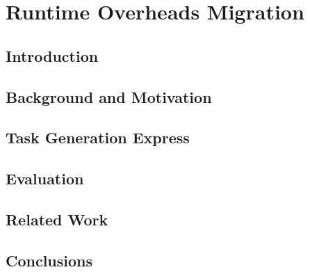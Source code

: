 \newcommand{\proposal}{TaskGenX}
\chapter{Runtime Overheads Migration}
\section{Introduction}
\label{sec:intro}



\section{Background and Motivation}
\label{sec:background}


\section{Task Generation Express}
\label{sec:ram}






\section{Evaluation}
\label{sec:evaluation}


\section{Related Work}
\label{sec:related}


\section{Conclusions}
\label{sec:conclusions}


